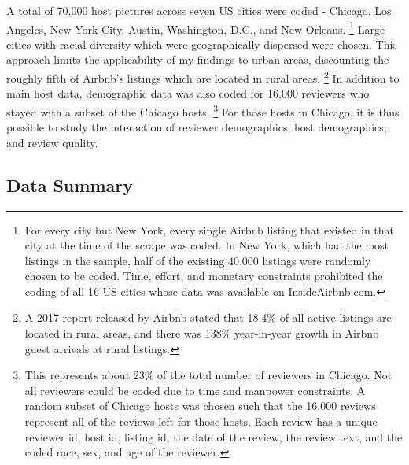 A total of 70,000 host pictures across seven US cities were coded - Chicago, Los Angeles, New York City, Austin, Washington, D.C., and New Orleans.%
	\footnote{For every city but New York, every single Airbnb listing that existed in that city at the time of the scrape was coded. In New York, which had the most listings in the sample, half of the existing 40,000 listings were randomly chosen to be coded. Time, effort, and monetary constraints prohibited the coding of all 16 US cities whose data was available on InsideAirbnb.com.} 
Large cities with racial diversity which were geographically dispersed were chosen. This approach limits the applicability of my findings to urban areas, discounting the roughly fifth of Airbnb's listings which are located in rural areas.%
	\footnote{A 2017 report released by Airbnb stated that 18.4\% of all active listings are located in rural areas, and there was 138\% year-in-year growth in Airbnb guest arrivals at rural listings.} 
In addition to main host data, demographic data was also coded for 16,000 reviewers who stayed with a subset of the Chicago hosts.%
	\footnote{This represents about 23\% of the total number of reviewers in Chicago. Not all reviewers could be coded due to time and manpower constraints. A random subset of Chicago hosts was chosen such that the 16,000 reviews represent all of the reviews left for those hosts. Each review has a unique reviewer id, host id, listing id, the date of the review, the review text, and the coded race, sex, and age of the reviewer.}
For those hosts in Chicago, it is thus possible to study the interaction of reviewer demographics, host demographics, and review quality.


\subsection{Data Summary}

